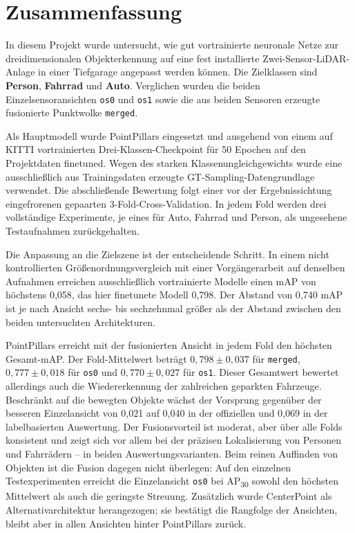 \section*{Zusammenfassung}

In diesem Projekt wurde untersucht, wie gut vortrainierte neuronale Netze zur dreidimensionalen Objekterkennung auf eine fest installierte Zwei-Sensor-LiDAR-Anlage in einer Tiefgarage angepasst werden können. Die Zielklassen sind \textbf{Person}, \textbf{Fahrrad} und \textbf{Auto}. Verglichen wurden die beiden Einzelsensoransichten \texttt{os0} und \texttt{os1} sowie die aus beiden Sensoren erzeugte fusionierte Punktwolke \texttt{merged}.

Als Hauptmodell wurde PointPillars eingesetzt und ausgehend von einem auf KITTI vortrainierten Drei-Klassen-Checkpoint für 50 Epochen auf den Projektdaten finetuned. Wegen des starken Klassenungleichgewichts wurde eine ausschließlich aus Trainingsdaten erzeugte GT-Sampling-Datengrundlage verwendet. Die abschließende Bewertung folgt einer vor der Ergebnissichtung eingefrorenen gepaarten 3-Fold-Cross-Validation. In jedem Fold werden drei vollständige Experimente, je eines für Auto, Fahrrad und Person, als ungesehene Testaufnahmen zurückgehalten.

Die Anpassung an die Zielszene ist der entscheidende Schritt. In einem nicht kontrollierten Größenordnungsvergleich mit einer Vorgängerarbeit auf denselben Aufnahmen erreichen ausschließlich vortrainierte Modelle einen mAP von höchstens 0{,}058, das hier finetunete Modell 0{,}798. Der Abstand von 0{,}740 mAP ist je nach Ansicht sechs- bis sechzehnmal größer als der Abstand zwischen den beiden untersuchten Architekturen.

PointPillars erreicht mit der fusionierten Ansicht in jedem Fold den höchsten Gesamt-mAP. Der Fold-Mittelwert beträgt \(0{,}798 \pm 0{,}037\) für \texttt{merged}, \(0{,}777 \pm 0{,}018\) für \texttt{os0} und \(0{,}770 \pm 0{,}027\) für \texttt{os1}. Dieser Gesamtwert bewertet allerdings auch die Wiedererkennung der zahlreichen geparkten Fahrzeuge. Beschränkt auf die bewegten Objekte wächst der Vorsprung gegenüber der besseren Einzelansicht von 0{,}021 auf 0{,}040 in der offiziellen und 0{,}069 in der labelbasierten Auswertung. Der Fusionsvorteil ist moderat, aber über alle Folds konsistent und zeigt sich vor allem bei der präzisen Lokalisierung von Personen und Fahrrädern -- in beiden Auswertungsvarianten. Beim reinen Auffinden von Objekten ist die Fusion dagegen nicht überlegen: Auf den einzelnen Testexperimenten erreicht die Einzelansicht \texttt{os0} bei AP\textsubscript{30} sowohl den höchsten Mittelwert als auch die geringste Streuung. Zusätzlich wurde CenterPoint als Alternativarchitektur herangezogen; sie bestätigt die Rangfolge der Ansichten, bleibt aber in allen Ansichten hinter PointPillars zurück.

